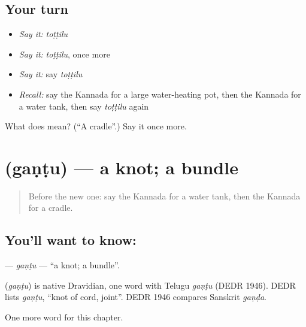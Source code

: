 \subsection*{Your turn}
\begin{itemize}
\raggedright
  \item \emph{Say it:} \emph{toṭṭilu}
  \item \emph{Say it:} \emph{toṭṭilu}, once more
  \item \emph{Say it:} say \emph{toṭṭilu}
  \item \emph{Recall:} say the Kannada for a large water-heating pot, then the Kannada for a water tank, then say \emph{toṭṭilu} again
\end{itemize}

\begin{tcolorbox}[breakable,colback=teal!4,colframe=teal!35!black,title={Before you move on}]
What does  mean? (\textquotedblleft{}A cradle\textquotedblright{}.) Say it once more.
\end{tcolorbox}
\section[\texorpdfstring{\kn{ಗಂಟು} (gaṇṭu)}{ಗಂಟು (gaṇṭu)}]{ (gaṇṭu) — a knot; a bundle}

\label{lesson:KA-C229-gantu}



\begin{quote}
Before the new one: say the Kannada for a water tank, then the Kannada for a cradle.
\end{quote}

\subsection*{You'll want to know: }
\textbf{} — \emph{gaṇṭu} — \textquotedblleft{}a knot; a bundle\textquotedblright{}.

\begin{cousinweb}
\textbf{} (\emph{gaṇṭu}) is native Dravidian, one word with Telugu \emph{gaṇṭu} (DEDR 1946). DEDR lists \emph{gaṇṭu}, \textquotedblleft{}knot of cord, joint\textquotedblright{}. DEDR 1946 compares Sanskrit \emph{gaṇḍa}.
\end{cousinweb}

\begin{grammarlens}[title={What you've built}]
One more word for this chapter.
\end{grammarlens}

